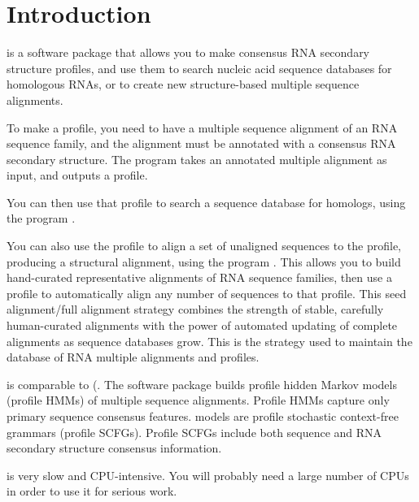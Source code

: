 \chapter{Introduction}

 is a software package that allows you to make
consensus RNA secondary structure profiles, and use them to search
nucleic acid sequence databases for homologous RNAs, or to create new
structure-based multiple sequence alignments.

To make a profile, you need to have a multiple sequence alignment of
an RNA sequence family, and the alignment must be annotated with a
consensus RNA secondary structure. The program  takes an
annotated multiple alignment as input, and outputs a profile.

You can then use that profile to search a sequence database for homologs,
using the program .

You can also use the profile to align a set of unaligned sequences to
the profile, producing a structural alignment, using the program
. This allows you to build hand-curated representative
alignments of RNA sequence families, then use a profile to
automatically align any number of sequences to that profile.  This
seed alignment/full alignment strategy combines the strength of
stable, carefully human-curated alignments with the power of automated
updating of complete alignments as sequence databases grow. This is
the strategy used to maintain the  database of RNA
multiple alignments and profiles.

 is comparable to 
(.  The
 software package builds profile hidden Markov models
(profile HMMs) of multiple sequence alignments. Profile HMMs capture
only primary sequence consensus features.  models
are profile stochastic context-free grammars (profile SCFGs).  Profile
SCFGs include both sequence and RNA secondary structure consensus
information.

 is very slow and CPU-intensive. You will probably
need a large number of CPUs in order to use it for serious work.






